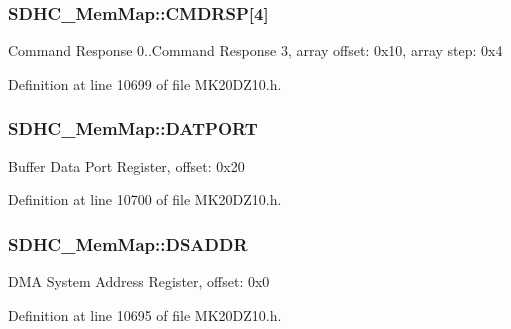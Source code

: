\subsubsection[{\texorpdfstring{C\+M\+D\+R\+SP}{CMDRSP}}]{ S\+D\+H\+C\+\_\+\+Mem\+Map\+::\+C\+M\+D\+R\+SP\mbox{[}4\mbox{]}}\hypertarget{struct_s_d_h_c___mem_map_ad68e1706e76585042d163c6798c0f545}{}\label{struct_s_d_h_c___mem_map_ad68e1706e76585042d163c6798c0f545}
Command Response 0..Command Response 3, array offset\+: 0x10, array step\+: 0x4 

Definition at line 10699 of file M\+K20\+D\+Z10.\+h.

\subsubsection[{\texorpdfstring{D\+A\+T\+P\+O\+RT}{DATPORT}}]{ S\+D\+H\+C\+\_\+\+Mem\+Map\+::\+D\+A\+T\+P\+O\+RT}\hypertarget{struct_s_d_h_c___mem_map_a35328e0ac868a1173f45025dfe9d064a}{}\label{struct_s_d_h_c___mem_map_a35328e0ac868a1173f45025dfe9d064a}
Buffer Data Port Register, offset\+: 0x20 

Definition at line 10700 of file M\+K20\+D\+Z10.\+h.

\subsubsection[{\texorpdfstring{D\+S\+A\+D\+DR}{DSADDR}}]{ S\+D\+H\+C\+\_\+\+Mem\+Map\+::\+D\+S\+A\+D\+DR}\hypertarget{struct_s_d_h_c___mem_map_ab31a362061944d6279ddb9477319dadf}{}\label{struct_s_d_h_c___mem_map_ab31a362061944d6279ddb9477319dadf}
D\+MA System Address Register, offset\+: 0x0 

Definition at line 10695 of file M\+K20\+D\+Z10.\+h.

